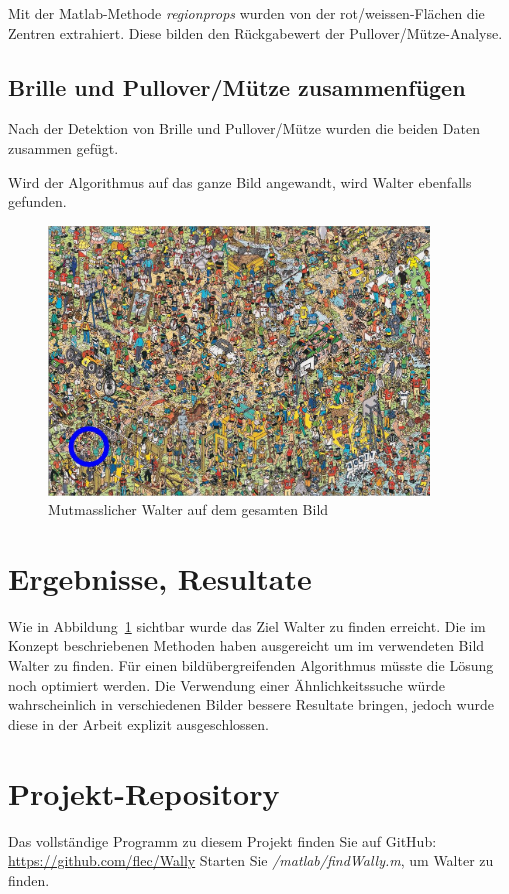 \documentclass[paper=a4,fontsize=12pt]{scrartcl}
\begin{document}
\noindent Mit der Matlab-Methode \emph{regionprops} wurden von der rot/weissen-Flächen die Zentren extrahiert. Diese bilden den Rückgabewert der Pullover/Mütze-Analyse.
\newpage

\subsection*{Brille und Pullover/Mütze zusammenfügen}
Nach der Detektion von Brille und Pullover/Mütze wurden die beiden Daten zusammen gefügt.


\noindent Wird der Algorithmus auf das ganze Bild angewandt, wird Walter ebenfalls gefunden.
\begin{figure}[htbp] 
\centering
  \includegraphics[width=0.9\textwidth]{img/findWallyFull.jpg}
  \caption{Mutmasslicher Walter auf dem gesamten Bild}
  \label{fig:findWallyFull}
\end{figure}

\newpage
\section*{Ergebnisse, Resultate}
Wie in Abbildung~\ref{fig:findWallyFull} sichtbar wurde das Ziel Walter zu finden erreicht. Die im Konzept beschriebenen Methoden haben ausgereicht um im verwendeten Bild Walter zu finden. Für einen bildübergreifenden Algorithmus müsste die Lösung noch optimiert werden. Die Verwendung einer Ähnlichkeitssuche würde wahrscheinlich in verschiedenen Bilder bessere Resultate bringen, jedoch wurde diese in der Arbeit explizit ausgeschlossen.

\section*{Projekt-Repository}
Das vollständige Programm zu diesem Projekt finden Sie auf GitHub:\newline
\url{https://github.com/flec/Wally}\newline
Starten Sie \mbox{\emph{/matlab/findWally.m}}, um Walter zu finden.
\end{document}
